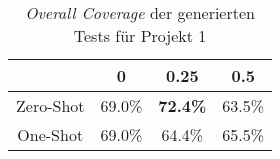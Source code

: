 \bgroup
\def\arraystretch{2}
\begin{table}[H]
	\vspace{.5cm}
	\centering		
	\begin{center}
		\begin{tabular}{|c||c|c|c|}
			\hline 
			& 0 & 0.25 & 0.5 \\
			\hline 
			\hline
			Zero-Shot & 69.0\% & \textbf{72.4\%} & 63.5\% \\
			\hline
			One-Shot & 69.0\% & 64.4\% & 65.5\% \\
			\hline
		\end{tabular} 
	\end{center}
	\caption{\textit{Overall Coverage} der generierten Tests für Projekt 1}
	\label{fig:o-1}
	\vspace{-.8cm}
\end{table}
\egroup